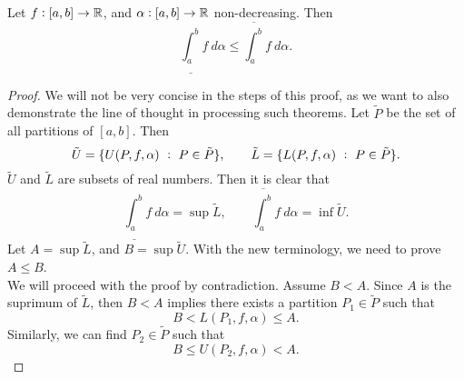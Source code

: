 \begin{proposition}
	Let $f:[a,b] \to \mathbb{R}$, and $\alpha:[a,b] \to \mathbb{R}$ non-decreasing.
	Then 
	\[ \underline{\int_a^b} f\ d\alpha \leq \overline{\int_a^b} f\ d\alpha. \]
\end{proposition}
\begin{proof}
	We will not be very concise in the steps of this proof, as we want to also demonstrate the line of thought in processing such theorems. Let $\tilde{P}$ be the set of all partitions of $[a,b]$. Then
	\[ \tilde{U} = \{U(P,f,\alpha)\ :\ P \in \tilde{P}\}, \qquad \tilde{L} = \{L(P,f,\alpha)\ :\ P \in \tilde{P}\}. \]
	$\tilde{U}$ and $\tilde{L}$ are subsets of real numbers. Then it is clear that 
	\[  \underline{\int_a^b} f\ d\alpha = \sup \tilde{L}, \qquad \overline{\int_a^b} f\ d\alpha = \inf \tilde{U}. \]
	Let $A = \sup \tilde{L}$, and $B = \sup\tilde{U}$. With the new terminology, we need to prove $A \leq B$.\\
	We will proceed with the proof by contradiction. Assume $B < A$. Since $A$ is the suprimum of $\tilde{L}$, then $B<A$ implies there exists a partition $P_1 \in \tilde{P}$ such that 
	\[ B < L(P_1, f, \alpha) \leq A. \]
	Similarly, we can find $P_2 \in \tilde{P}$ such that 
	\[ B \leq U(P_2, f, \alpha) < A. \]
	
\end{proof}


